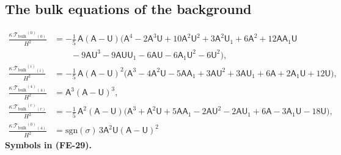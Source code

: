 \documentclass[
  10pt,
]{article}
\begin{document}
\hypertarget{the-bulk-equations-of-the-background}{%
\subsection{The bulk equations of the
background}\label{the-bulk-equations-of-the-background}}

\[
\begin{aligned}
\frac{\kappa\,\mathcal{T}_{\mathrm{bulk}}{}^{(0)}{}_{(0)}}{H^2} &= -\frac15\,\mathsf{A}(\mathsf{A} - \mathsf{U})\big(\mathsf{A}^4 - 2\mathsf{A}^3\mathsf{U}
 + 10\mathsf{A}^2\mathsf{U}^2 + 3\mathsf{A}^2\mathsf{U}_1 + 6\mathsf{A}^2 + 12\mathsf{A}\mathsf{A}_1\mathsf{U}\\
&\qquad - 9\mathsf{A}\mathsf{U}^3 - 9\mathsf{A}\mathsf{U}\mathsf{U}_1 - 6\mathsf{A}\mathsf{U} - 6\mathsf{A}_1\mathsf{U}^2 - 6\mathsf{U}^2\big),\\
\frac{\kappa\,\mathcal{T}_{\mathrm{bulk}}{}^{(i)}{}_{(i)}}{H^2} &= -\frac15\,\mathsf{A}(\mathsf{A} - \mathsf{U})^2\big(\mathsf{A}^3 - 4\mathsf{A}^2\mathsf{U}
 - 5\mathsf{A}\mathsf{A}_1 + 3\mathsf{A}\mathsf{U}^2 + 3\mathsf{A}\mathsf{U}_1 + 6\mathsf{A} + 2\mathsf{A}_1\mathsf{U} + 12\mathsf{U}\big),\\
\frac{\kappa\,\mathcal{T}_{\mathrm{bulk}}{}^{(4)}{}_{(4)}}{H^2} &= \mathsf{A}^3(\mathsf{A} - \mathsf{U})^3,\\
\frac{\kappa\,\mathcal{T}_{\mathrm{bulk}}{}^{(r)}{}_{(r)}}{H^2} &= -\frac15\,\mathsf{A}^2(\mathsf{A} - \mathsf{U})\big(\mathsf{A}^3 + \mathsf{A}^2\mathsf{U}
 + 5\mathsf{A}\mathsf{A}_1 - 2\mathsf{A}\mathsf{U}^2 - 2\mathsf{A}\mathsf{U}_1 + 6\mathsf{A} - 3\mathsf{A}_1\mathsf{U} - 18\mathsf{U}\big),\\
\frac{\kappa\,\mathcal{T}_{\mathrm{bulk}}{}^{(0)}{}_{(4)}}{H^2} &= \mathrm{sgn}(\sigma)\,3\mathsf{A}^2\mathsf{U}(\mathsf{A} - \mathsf{U})^2
\end{aligned} \tag{FE-29}
\] \textbf{Symbols in (FE-29).}
\end{document}
